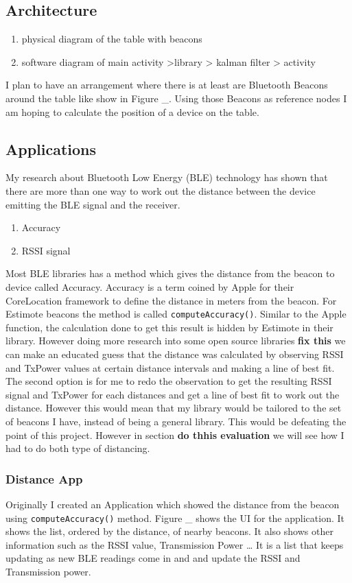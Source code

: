 \subsection{Architecture}
 \begin{enumerate}
 \item physical diagram of the table with beacons
 \item software diagram of main activity \-\->library \-\-> kalman filter \-\-> activity
 \end{enumerate}
 I plan to have an arrangement where there is at least are Bluetooth Beacons around the table like show in Figure \_. Using those Beacons as reference nodes I am hoping to calculate the position of a device on the table.

\subsection{Applications}
My research about Bluetooth Low Energy (BLE) technology has shown that there are more than one way to work out the distance between the device emitting the BLE signal and the receiver. 
\begin{enumerate}
\item Accuracy
\item RSSI signal
\end{enumerate}
Most BLE libraries has a method which gives the distance from the beacon to device called Accuracy. Accuracy is a term coined by Apple for their CoreLocation framework to define the distance in meters from the beacon. For Estimote beacons the method is called  \lstinline|computeAccuracy()|. Similar to the Apple function, the calculation done to get this result is hidden by Estimote in their library. However doing more research into some open source libraries \textbf{fix this}\cite{radius-ranging} we can make an educated guess that the distance was calculated by observing RSSI and TxPower values at certain distance intervals and making a line of best fit.
The second option is for me to redo the observation to get the resulting RSSI signal and TxPower for each distances and get a line of best fit to work out the distance. However this would mean that my library would be tailored to the set of beacons I have, instead of being a general library. This would be defeating the point of this project. However in section \textbf{do thhis evaluation} we will see how I had to do both type of distancing.

\subsubsection{Distance App}
Originally I created an Application which showed the distance from the beacon using \lstinline|computeAccuracy()| method. Figure \_ shows the UI for the application. It shows the list, ordered by the distance, of nearby beacons. It also shows other information such as the RSSI value, Transmission Power \ldots
It is a list that keeps updating as new BLE readings come in and and update the RSSI and Transmission power.

